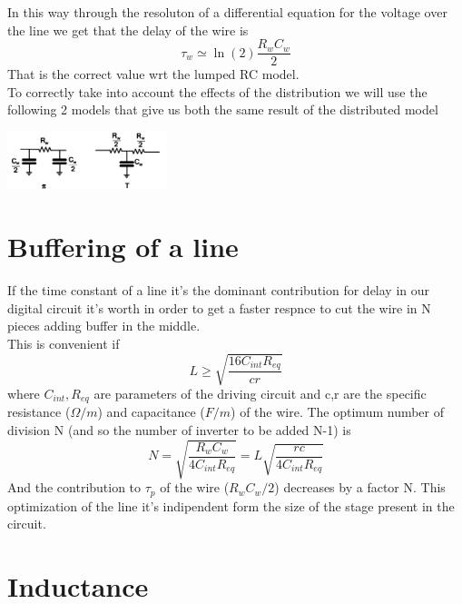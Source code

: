 In this way through the resoluton of a differential equation for the voltage over the line we get that the delay of the wire is 
\begin{equation}
\tau_w\simeq \ln(2)\frac{R_wC_w}{2}
\end{equation}
That is the correct value wrt the lumped RC model.\\

To correctly take into account the effects of the distribution we will use the following 2 models that give us both the same result of the distributed model

\centering
\includegraphics[width=0.35\textwidth]{C5_9.png}\\
\raggedright


\section{Buffering of a line}

If the time constant of a line it's the dominant contribution for delay in our digital circuit it's worth in order to get a faster respnce to cut the wire in N pieces adding buffer in the middle.\\
This is convenient if
\begin{equation}
L\ge\sqrt{\frac{16C_{int}R_{eq}}{cr}}
\end{equation}
where $C_{int},R_{eq}$ are parameters of the driving circuit and c,r are the specific resistance ($\Omega/m$) and capacitance ($F/m$) of the wire.
The optimum number of division N (and so the number of inverter to be added N-1) is
\begin{equation}
N=\sqrt{\frac{R_wC_w}{4C_{int}R_{eq}}}=L\sqrt{\frac{rc}{4C_{int}R_{eq}}}
\end{equation}
And the contribution to $\tau_p$ of the wire ($R_wC_w/2$) decreases by a factor N.
This optimization of the line it's indipendent form the size of the stage present in the circuit.\\

\section{Inductance}

